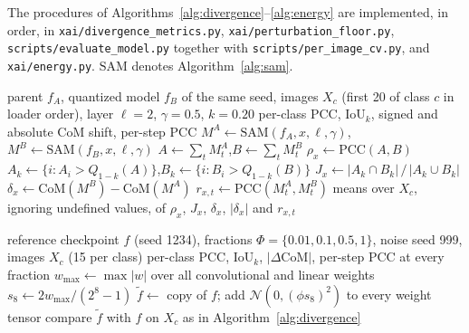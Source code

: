 \makeatletter
\begingroup
\renewcommand*{\float@listhead}[1]{\section*{#1}}%
\listofalgorithms
\bigskip
\endgroup
\makeatother

{\raggedright
The procedures of Algorithms~\ref{alg:divergence}--\ref{alg:energy} are
implemented, in order, in \texttt{xai/divergence\_metrics.py},
\texttt{xai/perturbation\_floor.py}, \texttt{scripts/evaluate\_model.py} together
with \texttt{scripts/per\_image\_cv.py}, and \texttt{xai/energy.py}.
$\mathrm{SAM}$ denotes Algorithm~\ref{alg:sam}.\par}

\begin{algorithm}[htbp]
\caption{Explanation divergence between a quantized model and its parent}
\label{alg:divergence}
\begin{algorithmic}[1]
\REQUIRE parent $f_A$, quantized model $f_B$ of the same seed, images $X_c$
         (first 20 of class $c$ in loader order), layer $\ell = 2$,
         $\gamma = 0.5$, $k = 0.20$
\ENSURE  per-class PCC, IoU$_k$, signed and absolute CoM shift, per-step PCC
  \STATE $M^{A} \gets \mathrm{SAM}(f_A, x, \ell, \gamma)$,\quad
         $M^{B} \gets \mathrm{SAM}(f_B, x, \ell, \gamma)$ \COMMENT{$[T, H, W]$}
  \STATE $A \gets \sum_t M^{A}_t$,\quad $B \gets \sum_t M^{B}_t$
  \STATE $\rho_x \gets \mathrm{PCC}(A, B)$ 
  \STATE $A_k \gets \{i : A_i > Q_{1-k}(A)\}$,\quad $B_k \gets \{i : B_i > Q_{1-k}(B)\}$
  \STATE $J_x \gets |A_k \cap B_k| \,/\, |A_k \cup B_k|$
  \STATE $\delta_x \gets \mathrm{CoM}(M^{B}) - \mathrm{CoM}(M^{A})$ 
    \STATE $r_{x,t} \gets \mathrm{PCC}(M^{A}_t, M^{B}_t)$
  \ENDFOR
\ENDFOR
\RETURN means over $X_c$, ignoring undefined values, of $\rho_x$, $J_x$,
        $\delta_x$, $|\delta_x|$ and $r_{x,t}$
\end{algorithmic}
\end{algorithm}

\begin{algorithm}[htbp]
\caption{Numerical floor by weight perturbation}
\label{alg:floor}
\begin{algorithmic}[1]
\REQUIRE reference checkpoint $f$ (seed 1234), fractions
         $\Phi = \{0.01, 0.1, 0.5, 1\}$, noise seed 999, images $X_c$ (15 per class)
\ENSURE  per-class PCC, IoU$_k$, $|\Delta\mathrm{CoM}|$, per-step PCC at every fraction
\STATE $w_{\max} \gets \max |w|$ over all convolutional and linear weights
\STATE $s_8 \gets 2 w_{\max} / (2^{8} - 1)$ 
\FOR{$\phi \in \Phi$}
  \STATE $\tilde f \gets$ copy of $f$; add $\mathcal{N}(0, (\phi s_8)^2)$ to every
         weight tensor 
  \STATE compare $\tilde f$ with $f$ on $X_c$ as in Algorithm~\ref{alg:divergence}
\ENDFOR
\end{algorithmic}
\end{algorithm}

